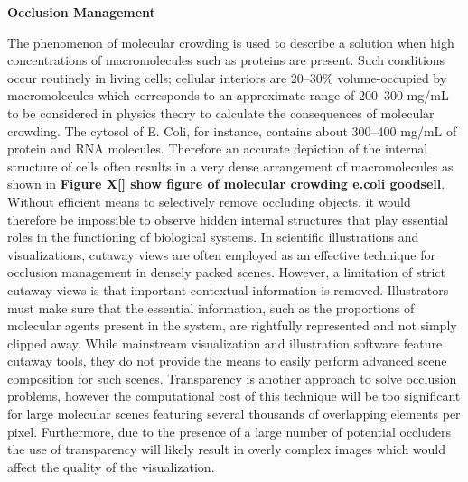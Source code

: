 
\textbf{Occlusion Management}

The phenomenon of molecular crowding is used to describe a solution when high concentrations of macromolecules such as proteins are present.
Such conditions occur routinely in living cells; cellular interiors are 20–30\% volume-occupied by macromolecules which corresponds to an approximate range of 200–300 mg/mL to be considered in physics theory to calculate the consequences of molecular crowding.
The cytosol of E. Coli, for instance, contains about 300–400 mg/mL of protein and RNA molecules.
Therefore an accurate depiction of the internal structure of cells often results in a very dense arrangement of macromolecules as shown in \textbf{Figure X[] show figure of molecular crowding e.coli goodsell}.
Without efficient means to selectively remove occluding objects, it would therefore be impossible to observe hidden internal structures that play essential roles in the functioning of biological systems.
In scientific illustrations and visualizations, cutaway views are often employed as an effective technique for occlusion management in densely packed scenes.
However, a limitation of strict cutaway views is that important contextual information is removed.
Illustrators must make sure that the essential information, such as the proportions of molecular agents present in the system, are rightfully represented and not simply clipped away.
While mainstream visualization and illustration software feature cutaway tools, they do not provide the means to easily perform advanced scene composition for such scenes.
Transparency is another approach to solve occlusion problems, however the computational cost of this technique will be too significant for large molecular scenes featuring several thousands of overlapping elements per pixel.
Furthermore, due to the presence of a large number of potential occluders the use of transparency will likely result in overly complex images which would affect the quality of the visualization.

